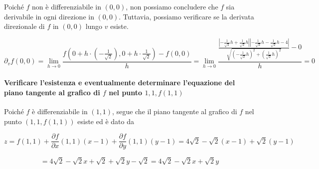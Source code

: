 \documentclass{article}
\begin{document}
Poiché \(f\) non è differenziabile in \((0,0)\), non possiamo concludere che \(f\) sia derivabile in ogni direzione in \((0,0)\). Tuttavia, possiamo verificare se la derivata direzionale di \(f\) in \((0,0)\) lungo \(v\) esiste.

\[
\partial_v f(0,0) = \lim_{h \to 0} \frac{f(0 + h \cdot (-\frac{1}{\sqrt{2}}), 0 + h \cdot \frac{1}{\sqrt{2}}) - f(0,0)}{h} = \lim_{h \to 0} \frac{\frac{|-\frac{1}{\sqrt{2}}h + \frac{1}{\sqrt{2}}h||-\frac{1}{\sqrt{2}}h -\frac{1}{\sqrt{2}}h - 4|}{\sqrt{(-\frac{1}{\sqrt{2}}h)^2 + (\frac{1}{\sqrt{2}}h)^2}} - 0}{h} = 0
\]

\paragraph{Verificare l'esistenza e eventualmente determinare l'equazione del piano tangente al grafico di \(f\) nel punto \(1,1, f(1,1)\)}

Poiché \(f\) è differenziabile in \((1,1)\), segue che il piano tangente al grafico di \(f\) nel punto \((1,1,f(1,1))\) esiste ed è dato da

\[
z = f(1,1) + \frac{\partial f}{\partial x}(1,1)(x-1) + \frac{\partial f}{\partial y}(1,1)(y-1) = 4\sqrt{2} - \sqrt{2}(x-1) + \sqrt{2}(y-1) 
\]

\[
= 4\sqrt{2} - \sqrt{2}x + \sqrt{2} + \sqrt{2}y - \sqrt{2} = 4\sqrt{2} - \sqrt{2}x + \sqrt{2}y
\]
\end{document}

